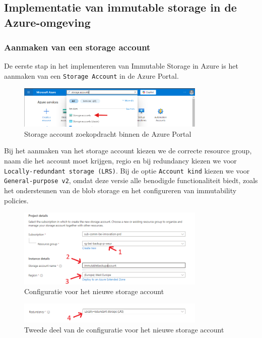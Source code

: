 \newpage
\subsection{Implementatie van immutable storage in de Azure-omgeving}
\subsubsection{Aanmaken van een storage account}
De eerste stap in het implementeren van Immutable Storage in Azure is het aanmaken van een \texttt{Storage Account} in de Azure Portal. 
\begin{figure}[h]
    \centering
    \captionsetup{justification=centering}    
    \includegraphics[width=0.8\textwidth]{img/1imm.png}
    \caption{Storage account zoekopdracht binnen de Azure Portal}
\end{figure}
Bij het aanmaken van het storage account kiezen we de correcte resource group, naam die het account moet krijgen, regio en bij redundancy kiezen we voor \texttt{Locally-redundant storage (LRS)}. Bij de optie \texttt{Account kind} kiezen we voor \texttt{General-purpose v2}, omdat deze versie alle benodigde functionaliteit biedt, zoals het ondersteunen van de blob storage en het configureren van immutability policies. 
\begin{figure}[h]
    \centering
    \captionsetup{justification=centering}    
    \includegraphics[width=0.8\textwidth]{img/3.1imm.png}
    \caption{Configuratie voor het nieuwe storage account}
\end{figure}
\begin{figure}[h]
    \centering
    \captionsetup{justification=centering}    
    \includegraphics[width=0.8\textwidth]{img/3.2imm.png}
    \caption{Tweede deel van de configuratie voor het nieuwe storage account}
\end{figure}
\newpage
